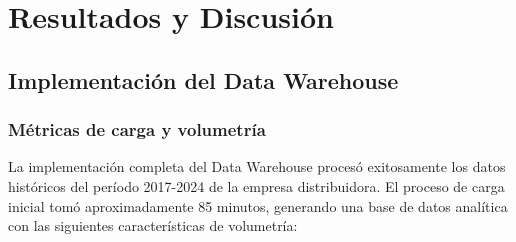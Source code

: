 \chapter{Resultados y Discusión}
\section{Implementación del Data Warehouse}
\subsection{Métricas de carga y volumetría}
La implementación completa del Data Warehouse procesó exitosamente los datos históricos del período 2017-2024 de la empresa distribuidora. El proceso de carga inicial tomó aproximadamente 85 minutos, generando una base de datos analítica con las siguientes características de volumetría:

